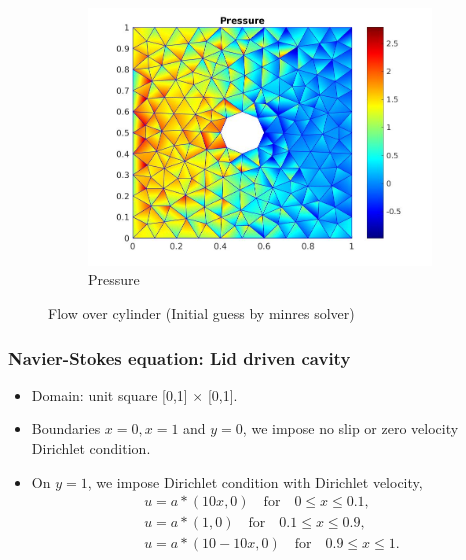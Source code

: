 \documentclass{beamer}
\begin{document}
\begin{frame}
\begin{figure}
\begin{subfigure}{0.3\textwidth}
    \includegraphics[width=\linewidth]{cylinder_newton_pressure_minres.jpg}
    \caption{Pressure}
  \label{pressure_navier_stoke_minres}
  \end{subfigure}
\caption{Flow over cylinder (Initial guess by minres solver)}
\label{flow_over_cylinder_minres_n_s}
\end{figure}
\end{frame}
\begin{frame}
\frametitle{Navier-Stokes equation: Lid driven cavity}
\begin{itemize}
\item Domain: unit square [0,1] $\times$ [0,1].
\item Boundaries ${x = 0}, {x = 1}$ and ${y = 0}$, we impose no slip or zero velocity Dirichlet condition. 
\item On ${y = 1}$, we impose Dirichlet condition with Dirichlet velocity,
\begin{equation}
\begin{split}
u = a*(10x,0) \quad \textrm{for} \quad 0 \leq x \leq 0.1 \textrm{,}\\
u = a*(1,0) \quad \textrm{for} \quad 0.1 \leq x \leq 0.9 \textrm{,}\\
u = a*(10 - 10x,0) \quad \textrm{for} \quad 0.9 \leq x \leq 1 \textrm{.}
\end{split}
\end{equation}
\end{itemize}
\end{frame}
\end{document}

